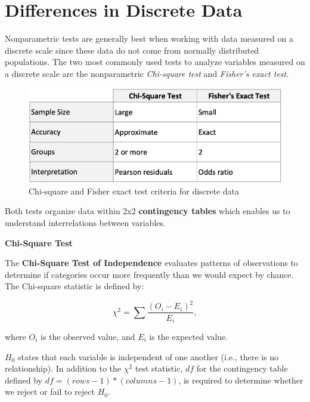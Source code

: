 \documentclass[
]{book}
\begin{document}
\hypertarget{differences-in-discrete-data}{%
\section{Differences in Discrete Data}\label{differences-in-discrete-data}}

Nonparametric tests are generally best when working with data measured on a discrete scale since these data do not come from normally distributed populations. The two most commonly used tests to analyze variables measured on a discrete scale are the nonparametric \emph{Chi-square test} and \emph{Fisher's exact test}.

\begin{figure}

{\centering \includegraphics[width=1\linewidth]{graphics/discrete_differences_test_table} 

}

\caption{Chi-square and Fisher exact test criteria for discrete data}\label{fig:discrete-tests}
\end{figure}

Both tests organize data within 2x2 \textbf{contingency tables} which enables us to understand interrelations between variables.

\textbf{Chi-Square Test}

The \textbf{Chi-Square Test of Independence} evaluates patterns of observations to determine if categories occur more frequently than we would expect by chance. The Chi-square statistic is defined by:

\[ {\chi}^2 = \sum\frac{(O_i - E_i)^2}{E_i}, \]

where \(O_i\) is the observed value, and \(E_i\) is the expected value.

\(H_0\) states that each variable is independent of one another (i.e., there is no relationship). In addition to the \({\chi}^2\) test statistic, \(df\) for the contingency table defined by \(df = (rows - 1) * (columns - 1)\), is required to determine whether we reject or fail to reject \(H_0\).
\end{document}
